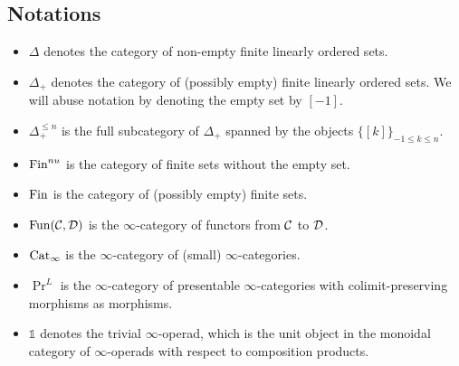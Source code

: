 \subsection{Notations}
\begin{itemize}
	\item $\Delta$ denotes the category of non-empty finite linearly ordered sets.
	\item $\Delta_{+}$ denotes the category of (possibly empty) finite linearly ordered sets. We will abuse notation by denoting the empty set by $[-1]$.
	\item $\Delta^{\leq n}_{+}$ is the full subcategory of $\Delta_{+}$ spanned by the objects $\{[k]\}_{-1\leq k\leq n}$.
	\item $\operatorname{Fin}^{nu}$ is the category of finite sets without the empty set. 
	\item $\operatorname{Fin}$ is the category of (possibly empty) finite sets. 
	\item $\operatorname{Fun}({\mathcal{C}},{\mathcal{D}})$ is the $\infty$-category of functors from ${\mathcal{C}}$ to ${\mathcal{D}}$.
	\item $\operatorname{Cat}_{\infty}$ is the $\infty$-category of (small) $\infty$-categories.
	\item $\Pr^{L}$ is the $\infty$-category of presentable $\infty$-categories with colimit-preserving morphisms as morphisms.
	\item $\mathds{1}$ denotes the trivial $\infty$-operad, which is the unit object in the monoidal category of $\infty$-operads with respect to composition products.
\end{itemize}